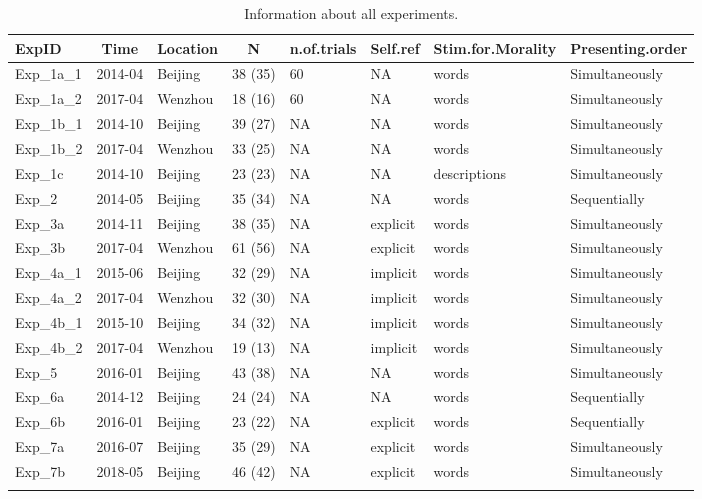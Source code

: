\documentclass[
  man]{apa6}
\begin{document}
\begin{table}[tbp]

\begin{center}
\begin{threeparttable}

\caption{\label{tab:Table_1_exp_info}Information about all experiments.}

\begin{tabular}{llllllll}
\toprule
ExpID & \multicolumn{1}{c}{Time} & \multicolumn{1}{c}{Location} & \multicolumn{1}{c}{N} & \multicolumn{1}{c}{n.of.trials} & \multicolumn{1}{c}{Self.ref} & \multicolumn{1}{c}{Stim.for.Morality} & \multicolumn{1}{c}{Presenting.order}\\
\midrule
Exp\_1a\_1 & 2014-04 & Beijing & 38 (35) & 60 & NA & words & Simultaneously\\
Exp\_1a\_2 & 2017-04 & Wenzhou & 18 (16) & 60 & NA & words & Simultaneously\\
Exp\_1b\_1 & 2014-10 & Beijing & 39 (27) & NA & NA & words & Simultaneously\\
Exp\_1b\_2 & 2017-04 & Wenzhou & 33 (25) & NA & NA & words & Simultaneously\\
Exp\_1c & 2014-10 & Beijing & 23 (23) & NA & NA & descriptions & Simultaneously\\
Exp\_2 & 2014-05 & Beijing & 35 (34) & NA & NA & words & Sequentially\\
Exp\_3a & 2014-11 & Beijing & 38 (35) & NA & explicit & words & Simultaneously\\
Exp\_3b & 2017-04 & Wenzhou & 61 (56) & NA & explicit & words & Simultaneously\\
Exp\_4a\_1 & 2015-06 & Beijing & 32 (29) & NA & implicit & words & Simultaneously\\
Exp\_4a\_2 & 2017-04 & Wenzhou & 32 (30) & NA & implicit & words & Simultaneously\\
Exp\_4b\_1 & 2015-10 & Beijing & 34 (32) & NA & implicit & words & Simultaneously\\
Exp\_4b\_2 & 2017-04 & Wenzhou & 19 (13) & NA & implicit & words & Simultaneously\\
Exp\_5 & 2016-01 & Beijing & 43 (38) & NA & NA & words & Simultaneously\\
Exp\_6a & 2014-12 & Beijing & 24 (24) & NA & NA & words & Sequentially\\
Exp\_6b & 2016-01 & Beijing & 23 (22) & NA & explicit & words & Sequentially\\
Exp\_7a & 2016-07 & Beijing & 35 (29) & NA & explicit & words & Simultaneously\\
Exp\_7b & 2018-05 & Beijing & 46 (42) & NA & explicit & words & Simultaneously\\
\bottomrule
\addlinespace
\end{tabular}


\end{threeparttable}
\end{center}
\end{table}
\end{document}
